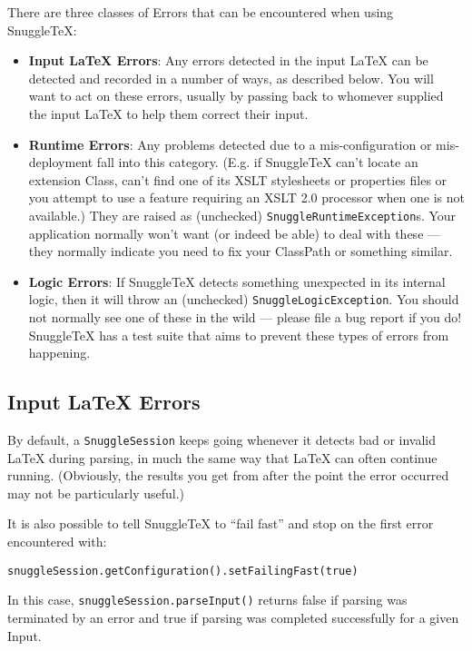 
There are three classes of Errors that can be encountered when using SnuggleTeX:

\begin{itemize}

\item \textbf{Input LaTeX Errors}: Any errors detected in the input LaTeX can
  be detected and recorded in a number of ways, as described below. You will
  want to act on these errors, usually by passing back to whomever supplied
  the input LaTeX to help them correct their input.

\item \textbf{Runtime Errors}: Any problems detected due to a mis-configuration
  or mis-deployment fall into this category.
  (E.g. if SnuggleTeX can't locate an extension Class, can't
  find one of its XSLT stylesheets or properties files or you attempt to use a
  feature requiring an XSLT 2.0 processor when one is not available.)
  They are raised as (unchecked) \verb|SnuggleRuntimeException|s. Your application
  normally won't want (or indeed be able) to deal with these --- they normally
  indicate you need to fix your ClassPath or something similar.

\item \textbf{Logic Errors}: If SnuggleTeX detects something unexpected in its
  internal logic, then it will throw an (unchecked) \verb|SnuggleLogicException|.
  You should not normally see one of these in the wild --- please file a bug report
  if you do! SnuggleTeX has a test suite that aims to prevent these types of errors
  from happening.
\end{itemize}

\subsection*{Input LaTeX Errors}

By default, a \verb|SnuggleSession| keeps going whenever it detects bad or
invalid LaTeX during parsing, in much the same way that LaTeX can often
continue running.
(Obviously, the results you get from after the point the error occurred
may not be particularly useful.)

It is also possible to tell SnuggleTeX to ``fail fast'' and stop on the first error
encountered with:
\begin{verbatim}snuggleSession.getConfiguration().setFailingFast(true)\end{verbatim}
In this case, \verb|snuggleSession.parseInput()| returns false if parsing was
terminated by an error and true if parsing was completed successfully for
a given Input.

